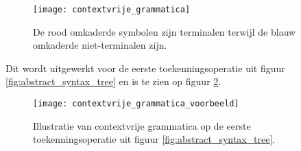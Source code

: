 {
\begin{figure}[h]
	\centering
	\texttt{[image: contextvrije\_grammatica]}
	\caption{De rood omkaderde symbolen zijn {\color{cvred} terminalen} terwijl de blauw omkaderde {\color{cvblue}niet-terminalen} zijn.} 
	\label{fig:contextvrije_grammatica}
\end{figure}
}
Dit wordt uitgewerkt voor de eerste toekenningsoperatie uit figuur \ref{fig:abstract_syntax_tree} en is te zien op figuur \ref{fig:contextvrije_grammatica_voorbeeld}.
\begin{figure}[h]
	\centering
	\texttt{[image: contextvrije\_grammatica\_voorbeeld]}
	\caption{Illustratie van contextvrije grammatica op de eerste toekenningsoperatie uit figuur \ref{fig:abstract_syntax_tree}.} 
	\label{fig:contextvrije_grammatica_voorbeeld}
\end{figure}

